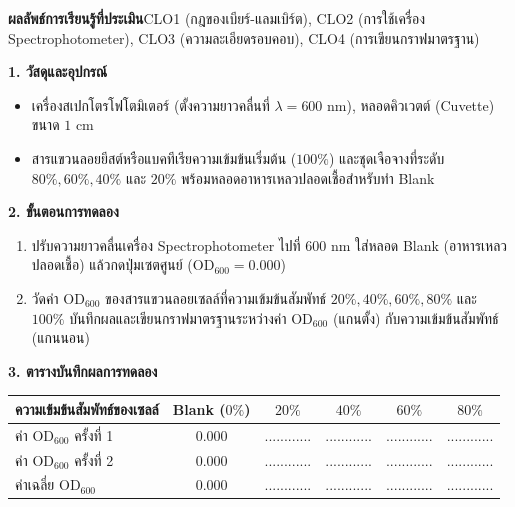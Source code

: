 \begin{labbox}
\noindent\textbf{ผลลัพธ์การเรียนรู้ที่ประเมิน}\quad CLO1 (กฎของเบียร์-แลมเบิร์ต), CLO2 (การใช้เครื่อง Spectrophotometer), CLO3 (ความละเอียดรอบคอบ), CLO4 (การเขียนกราฟมาตรฐาน)

\vspace{4pt}
\noindent\textbf{1. วัสดุและอุปกรณ์}
\begin{itemize}
    \item เครื่องสเปกโตรโฟโตมิเตอร์ (ตั้งความยาวคลื่นที่ $\lambda = 600\text{ nm}$), หลอดคิวเวตต์ (Cuvette) ขนาด $1\text{ cm}$
    \item สารแขวนลอยยีสต์หรือแบคทีเรียความเข้มข้นเริ่มต้น ($100\%$) และชุดเจือจางที่ระดับ $80\%, 60\%, 40\%$ และ $20\%$ พร้อมหลอดอาหารเหลวปลอดเชื้อสำหรับทำ Blank
\end{itemize}

\noindent\textbf{2. ขั้นตอนการทดลอง}
\begin{enumerate}
    \item ปรับความยาวคลื่นเครื่อง Spectrophotometer ไปที่ $600\text{ nm}$ ใส่หลอด Blank (อาหารเหลวปลอดเชื้อ) แล้วกดปุ่มเซตศูนย์ ($\text{OD}_{600} = 0.000$)
    \item วัดค่า $\text{OD}_{600}$ ของสารแขวนลอยเซลล์ที่ความเข้มข้นสัมพัทธ์ $20\%, 40\%, 60\%, 80\%$ และ $100\%$ บันทึกผลและเขียนกราฟมาตรฐานระหว่างค่า $\text{OD}_{600}$ (แกนตั้ง) กับความเข้มข้นสัมพัทธ์ (แกนนอน)
\end{enumerate}

\noindent\textbf{3. ตารางบันทึกผลการทดลอง}
\begin{center}
\footnotesize\setlength{\tabcolsep}{3.5pt}
\begin{tabularx}{\linewidth}{>{\raggedright\arraybackslash}X c c c c c}
\toprule
\textbf{ความเข้มข้นสัมพัทธ์ของเซลล์} & \textbf{Blank ($0\%$)} & \textbf{$20\%$} & \textbf{$40\%$} & \textbf{$60\%$} & \textbf{$80\%$} \\
\midrule
ค่า $\text{OD}_{600}$ ครั้งที่ 1 & $0.000$ & ............ & ............ & ............ & ............ \\
ค่า $\text{OD}_{600}$ ครั้งที่ 2 & $0.000$ & ............ & ............ & ............ & ............ \\
ค่าเฉลี่ย $\text{OD}_{600}$ & $0.000$ & ............ & ............ & ............ & ............ \\
\bottomrule
\end{tabularx}
\end{center}
\end{labbox}

